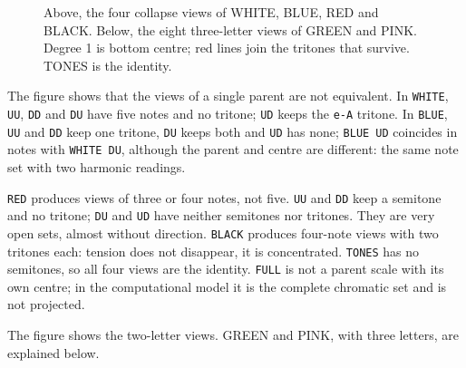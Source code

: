 \documentclass[]{report}
\begin{document}
\begin{figure}[p]
{
	}
	\caption{Above, the four collapse views of \textsf{WHITE}, \textsf{BLUE},
	\textsf{RED} and \textsf{BLACK}. Below, the eight three-letter views of
	\textsf{GREEN} and \textsf{PINK}. Degree 1 is bottom centre; red lines join
	the tritones that survive. \textsf{TONES} is the identity.}
	\label{tab:collapse-views-en}
\end{figure}

The figure shows that the views of a single parent are not equivalent. In
\texttt{WHITE}, \texttt{UU}, \texttt{DD} and \texttt{DU} have five notes and no
tritone; \texttt{UD} keeps the \texttt{e-A} tritone. In \texttt{BLUE},
\texttt{UU} and \texttt{DD} keep one tritone, \texttt{DU} keeps both and
\texttt{UD} has none; \texttt{BLUE UD} coincides in notes with \texttt{WHITE
DU}, although the parent and centre are different: the same note set with two
harmonic readings.

\texttt{RED} produces views of three or four notes, not five.
\texttt{UU} and \texttt{DD} keep a semitone and no tritone; \texttt{DU} and
\texttt{UD} have neither semitones nor tritones. They are very open sets, almost
without direction. \texttt{BLACK} produces four-note views with two tritones
each: tension does not disappear, it is concentrated. \texttt{TONES} has no
semitones, so all four views are the identity. \texttt{FULL} is not a parent
scale with its own centre; in the computational model it is the complete
chromatic set and is not projected.

The figure shows the two-letter views. \textsf{GREEN} and \textsf{PINK}, with
three letters, are explained below.
\end{document}
